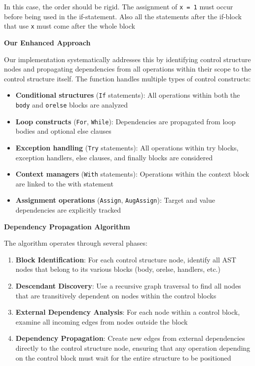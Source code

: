 \documentclass[%
thesis=student,%
coverpage=false,%
titlepage=false,%
headmarks=true, %
english,%
font=libertine, %
math=newpxtx, %
BCOR=5mm,%
coverBCOR=11mm%
]{tum-templates/book/tumbook}
\begin{document}
In this case, the order should be rigid. The assignment of \texttt{x = 1} must occur before being used in the if-statement. Also all the statements after the if-block that use \texttt{x} must come after the whole block

\textbf{Our Enhanced Approach}

Our implementation systematically addresses this by identifying control structure nodes and propagating dependencies from all operations within their scope to the control structure itself. The function handles multiple types of control constructs:

\begin{itemize}
    \item \textbf{Conditional structures} (\texttt{If} statements): All operations within both the \texttt{body} and \texttt{orelse} blocks are analyzed
    \item \textbf{Loop constructs} (\texttt{For}, \texttt{While}): Dependencies are propagated from loop bodies and optional else clauses
    \item \textbf{Exception handling} (\texttt{Try} statements): All operations within try blocks, exception handlers, else clauses, and finally blocks are considered
    \item \textbf{Context managers} (\texttt{With} statements): Operations within the context block are linked to the with statement
    \item \textbf{Assignment operations} (\texttt{Assign}, \texttt{AugAssign}): Target and value dependencies are explicitly tracked
\end{itemize}

\textbf{Dependency Propagation Algorithm}

The algorithm operates through several phases:

\begin{enumerate}
    \item \textbf{Block Identification}: For each control structure node, identify all AST nodes that belong to its various blocks (body, orelse, handlers, etc.)
    \item \textbf{Descendant Discovery}: Use a recursive graph traversal to find all nodes that are transitively dependent on nodes within the control blocks
    \item \textbf{External Dependency Analysis}: For each node within a control block, examine all incoming edges from nodes outside the block
    \item \textbf{Dependency Propagation}: Create new edges from external dependencies directly to the control structure node, ensuring that any operation depending on the control block must wait for the entire structure to be positioned
\end{enumerate}
\end{document}
